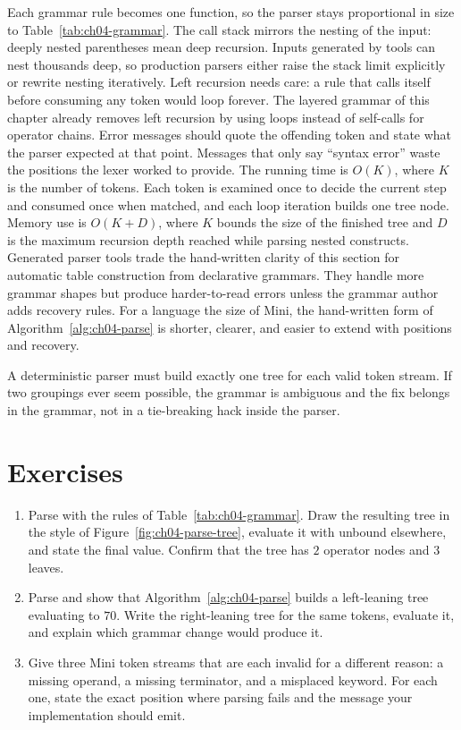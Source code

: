 Each grammar rule becomes one function, so the parser stays proportional in size to Table~\ref{tab:ch04-grammar}.
The call stack mirrors the nesting of the input: deeply nested parentheses mean deep recursion.
Inputs generated by tools can nest thousands deep, so production parsers either raise the stack limit explicitly or rewrite nesting iteratively.
Left recursion needs care: a rule that calls itself before consuming any token would loop forever.
The layered grammar of this chapter already removes left recursion by using loops instead of self-calls for operator chains.
Error messages should quote the offending token and state what the parser expected at that point.
Messages that only say \enquote{syntax error} waste the positions the lexer worked to provide.
The running time is $O(K)$, where $K$ is the number of tokens.
Each token is examined once to decide the current step and consumed once when matched, and each loop iteration builds one tree node.
Memory use is $O(K + D)$, where $K$ bounds the size of the finished tree and $D$ is the maximum recursion depth reached while parsing nested constructs.
Generated parser tools trade the hand-written clarity of this section for automatic table construction from declarative grammars.
They handle more grammar shapes but produce harder-to-read errors unless the grammar author adds recovery rules.
For a language the size of Mini, the hand-written form of Algorithm~\ref{alg:ch04-parse} is shorter, clearer, and easier to extend with positions and recovery.
\begin{ccnote}
A deterministic parser must build exactly one tree for each valid token stream.
If two groupings ever seem possible, the grammar is ambiguous and the fix belongs in the grammar, not in a tie-breaking hack inside the parser.
\end{ccnote}

\section{Exercises}
\label{sec:ch04-exercises}

\begin{enumerate}
\item \label{ex:ch04-trace-parse} Parse  with the rules of Table~\ref{tab:ch04-grammar}. Draw the resulting tree in the style of Figure~\ref{fig:ch04-parse-tree}, evaluate it with  unbound elsewhere, and state the final value. Confirm that the tree has $2$ operator nodes and $3$ leaves.
\item \label{ex:ch04-assoc} Parse  and show that Algorithm~\ref{alg:ch04-parse} builds a left-leaning tree evaluating to $70$. Write the right-leaning tree for the same tokens, evaluate it, and explain which grammar change would produce it.
\item \label{ex:ch04-error} Give three Mini token streams that are each invalid for a different reason: a missing operand, a missing terminator, and a misplaced keyword. For each one, state the exact position where parsing fails and the message your implementation should emit.
\end{enumerate}


